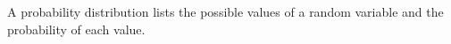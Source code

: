 \documentclass[preview]{standalone}
\begin{document}
\begin{center}
A probability distribution lists the possible values of a random variable and the probability of each value.
\end{center}
\end{document}
